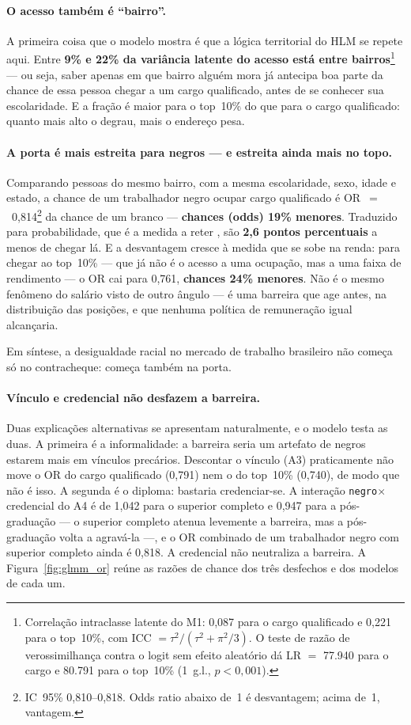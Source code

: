 \documentclass[11pt, a4paper, oneside]{article}
\begin{document}
\paragraph{O acesso também é ``bairro''.}
A primeira coisa que o modelo mostra é que a lógica territorial do HLM se repete aqui.
Entre \textbf{9\% e 22\% da variância latente do
acesso está entre bairros}\footnote{Correlação intraclasse latente do M1:
0,087 para o cargo qualificado e 0,221 para o top~10\%, com
ICC $= \tau^2/(\tau^2+\pi^2/3)$. O teste de razão de verossimilhança contra o logit sem
efeito aleatório dá LR $=$ 77.940 para o cargo e 80.791 para o top~10\%
(1~g.l., $p<0{,}001$).} --- ou seja, saber apenas em que bairro alguém mora já antecipa
boa parte da chance de essa pessoa chegar a um cargo qualificado, antes de se conhecer
sua escolaridade. E a fração é maior para o top~10\% do que para o cargo qualificado:
quanto mais alto o degrau, mais o endereço pesa.

\paragraph{A porta é mais estreita para negros --- e estreita ainda mais no topo.}
Comparando pessoas do mesmo bairro, com a mesma escolaridade, sexo, idade e estado,
a chance de um trabalhador negro ocupar cargo qualificado é
OR~$=$~0,814\footnote{IC~95\% 0,810--0,818. {Odds ratio} abaixo de~1 é
desvantagem; acima de~1, vantagem.} da chance de um branco --- \textbf{chances ({odds})
19\% menores}. Traduzido para probabilidade, que é a medida a reter
\cite{angrist2009}, são \textbf{2,6 pontos percentuais} a menos de chegar
lá. E a desvantagem cresce à medida que se sobe na renda: para chegar ao top~10\% ---
que já não é o acesso a uma ocupação, mas a uma faixa de rendimento --- o OR cai para
0,761, \textbf{chances 24\% menores}. Não é o mesmo fenômeno do
salário visto de outro ângulo --- é uma barreira que age antes, na distribuição das
posições, e que nenhuma política de remuneração igual alcançaria.

Em síntese, a desigualdade racial no mercado de trabalho brasileiro não começa
só no contracheque: começa também na porta.

\paragraph{Vínculo e credencial não desfazem a barreira.}
Duas explicações alternativas se apresentam naturalmente, e o modelo testa as duas. A
primeira é a informalidade: a barreira seria um artefato de negros estarem mais em
vínculos precários. Descontar o vínculo (A3) praticamente não move o OR do cargo
qualificado (0,791) nem o do top~10\% (0,740), de modo que não é
isso. A segunda é o diploma: bastaria credenciar-se. A interação
\texttt{negro}$\times$credencial do A4 é de 1,042 para o superior completo e
0,947 para a pós-graduação --- o superior completo atenua levemente a barreira, mas a pós-graduação volta a agravá-la ---, e o OR combinado de um
trabalhador negro com superior completo ainda é 0,818. A credencial não
neutraliza a barreira. A Figura~\ref{fig:glmm_or} reúne as razões
de chance dos três desfechos e dos modelos de cada um.
\end{document}
